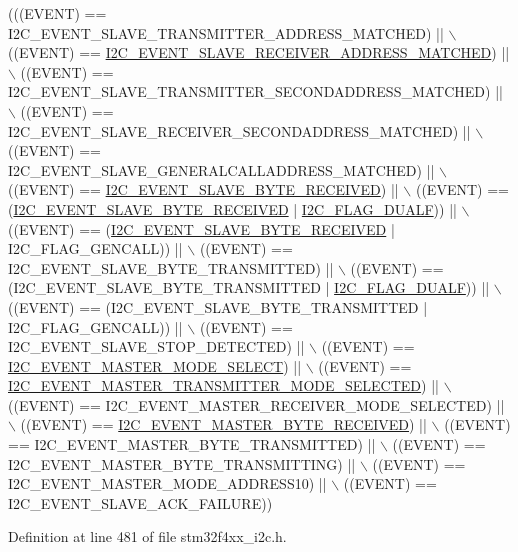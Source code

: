 \begin{DoxyCode}
(((EVENT) == I2C\_EVENT\_SLAVE\_TRANSMITTER\_ADDRESS\_MATCHED) || \(\backslash\)
                             ((EVENT) == 
      \hyperlink{group___i2_c___events_ga6cf0e334704618b024eee604849f50f7}{I2C\_EVENT\_SLAVE\_RECEIVER\_ADDRESS\_MATCHED}) || \(\backslash\)
                             ((EVENT) == I2C\_EVENT\_SLAVE\_TRANSMITTER\_SECONDADDRESS\_MATCHED) || \(\backslash\)
                             ((EVENT) == I2C\_EVENT\_SLAVE\_RECEIVER\_SECONDADDRESS\_MATCHED) || \(\backslash\)
                             ((EVENT) == I2C\_EVENT\_SLAVE\_GENERALCALLADDRESS\_MATCHED) || \(\backslash\)
                             ((EVENT) == \hyperlink{group___i2_c___events_ga8b244626839940569c6c8bbfc4efe21d}{I2C\_EVENT\_SLAVE\_BYTE\_RECEIVED}) || \(\backslash\)
                             ((EVENT) == (\hyperlink{group___i2_c___events_ga8b244626839940569c6c8bbfc4efe21d}{I2C\_EVENT\_SLAVE\_BYTE\_RECEIVED} | 
      \hyperlink{group___i2_c__flags__definition_ga3755b783aa73568659478c2e2e45e27f}{I2C\_FLAG\_DUALF})) || \(\backslash\)
                             ((EVENT) == (\hyperlink{group___i2_c___events_ga8b244626839940569c6c8bbfc4efe21d}{I2C\_EVENT\_SLAVE\_BYTE\_RECEIVED} | 
      I2C\_FLAG\_GENCALL)) || \(\backslash\)
                             ((EVENT) == I2C\_EVENT\_SLAVE\_BYTE\_TRANSMITTED) || \(\backslash\)
                             ((EVENT) == (I2C\_EVENT\_SLAVE\_BYTE\_TRANSMITTED | 
      \hyperlink{group___i2_c__flags__definition_ga3755b783aa73568659478c2e2e45e27f}{I2C\_FLAG\_DUALF})) || \(\backslash\)
                             ((EVENT) == (I2C\_EVENT\_SLAVE\_BYTE\_TRANSMITTED | I2C\_FLAG\_GENCALL)) || \(\backslash\)
                             ((EVENT) == I2C\_EVENT\_SLAVE\_STOP\_DETECTED) || \(\backslash\)
                             ((EVENT) == \hyperlink{group___i2_c___events_gaeef8c22ac035122b06e31b360ac7aeb3}{I2C\_EVENT\_MASTER\_MODE\_SELECT}) || \(\backslash\)
                             ((EVENT) == 
      \hyperlink{group___i2_c___events_ga2361a6e60b7dc86fb682dd06fbd3edb7}{I2C\_EVENT\_MASTER\_TRANSMITTER\_MODE\_SELECTED}) || \(\backslash\)
                             ((EVENT) == I2C\_EVENT\_MASTER\_RECEIVER\_MODE\_SELECTED) || \(\backslash\)
                             ((EVENT) == \hyperlink{group___i2_c___events_ga6bcf2ae49961e07e27cf9fdf334719e3}{I2C\_EVENT\_MASTER\_BYTE\_RECEIVED}) || \(\backslash\)
                             ((EVENT) == I2C\_EVENT\_MASTER\_BYTE\_TRANSMITTED) || \(\backslash\)
                             ((EVENT) == I2C\_EVENT\_MASTER\_BYTE\_TRANSMITTING) || \(\backslash\)
                             ((EVENT) == I2C\_EVENT\_MASTER\_MODE\_ADDRESS10) || \(\backslash\)
                             ((EVENT) == I2C\_EVENT\_SLAVE\_ACK\_FAILURE))
\end{DoxyCode}


Definition at line 481 of file stm32f4xx\-\_\-i2c.\-h.

